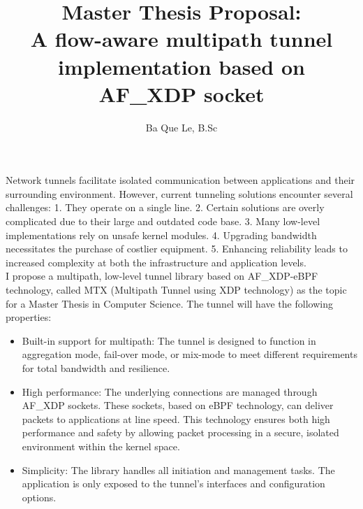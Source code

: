 \documentclass{article} %
\title{Master Thesis Proposal:\\A flow-aware multipath tunnel implementation based on AF\_XDP socket} %
\author{Ba Que Le, B.Sc} %
\begin{document}
\maketitle %

Network tunnels facilitate isolated communication between applications and their surrounding environment.
However, current tunneling solutions encounter several challenges: 1. They operate on a single line.
2. Certain solutions are overly complicated due to their large and outdated code base.
3. Many low-level implementations rely on unsafe kernel modules.
4. Upgrading bandwidth necessitates the purchase of costlier equipment.
5. Enhancing reliability leads to increased complexity at both the infrastructure and application levels.
\\

I propose a multipath, low-level tunnel library based on AF\_XDP-eBPF technology, called MTX (Multipath Tunnel using XDP technology) as the topic for a Master Thesis in Computer Science.
The tunnel will have the following properties:
\begin{itemize}
    \item Built-in support for multipath: The tunnel is designed to function in aggregation mode, fail-over mode, or mix-mode to meet different requirements for total bandwidth and resilience.
    \item  High performance: The underlying connections are managed through AF\_XDP sockets. These sockets, based on eBPF technology, can deliver packets to applications at line speed. This technology ensures both high performance and safety by allowing packet processing in a secure, isolated environment within the kernel space.
    \item  Simplicity: The library handles all initiation and management tasks. The application is only exposed to the tunnel's interfaces and configuration options.
\end{itemize}
\end{document}
